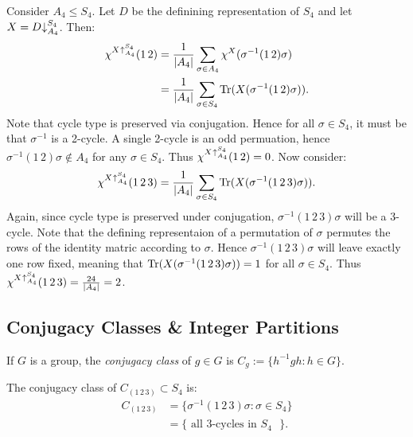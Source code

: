 \begin{example}
	Consider $A_4 \leq S_4$. Let $D$ be the definining representation of $S_4$ and let $X = D \hspace{-2.5pt}\downarrow_{A_4}^{S_4}$. Then:
	\begin{align*}
		\chi^{X \hspace{3pt}\uair_{A_4}^{S_4}}(1\,2)
		&= \frac{1}{|A_4|}\sum_{\sigma \in A_4}^{} \chi^X(\sigma^{-1}(1\,2)\sigma) \\
		&= \frac{1}{|A_4|}\sum_{\sigma \in S_4}^{} \Tr(X(\sigma^{-1}(1\,2)\sigma)).
	\end{align*}
	Note that cycle type is preserved via conjugation. Hence for all $\sigma \in S_4$, it must be that $\sigma^{-1}$ is a 2-cycle. A single 2-cycle is an odd permuation, hence $\sigma^{-1}(1\,2)\sigma \not\in A_4$ for any $\sigma \in S_4$. Thus $\chi^{X \hspace{3pt}\uair_{A_4}^{S_4}}(1\,2) = 0$. Now consider:
	\[
	\chi^{X \hspace{3pt}\uair_{A_4}^{S_4}}(1\,2\,3) = \frac{1}{|A_4|}\sum_{\sigma \in S_4}^{} \Tr(X(\sigma^{-1}(1\,2\,3)\sigma)).
	\] 
	Again, since cycle type is preserved under conjugation, $\sigma^{-1}(1\,2\,3)\sigma$ will be a 3-cycle. Note that the defining representaion of a permutation of $\sigma$ permutes the rows of the identity matric according to $\sigma$. Hence $\sigma^{-1}(1\,2\,3)\sigma$ will leave exactly one row fixed, meaning that $\operatorname{Tr}(X(\sigma^{-1}(1\,2\,3)\sigma)) = 1$ for all $\sigma \in S_4$. Thus $\chi^{X \hspace{3pt}\uair_{A_4}^{S_4}}(1\,2\,3) = \frac{24}{|A_4|} = 2$.
\end{example}

\subsection{Conjugacy Classes \& Integer Partitions}

\begin{definition}
	If $G$ is a group, the \emph{conjugacy class} of $g \in G$ is $C_g := \{h^{-1}gh : h \in G\}$.
\end{definition}

\begin{example}
	The conjugacy class of $C_{(1\,2\,3)} \subset S_4$ is:
	\begin{align*}
		C_{(1\,2\,3)}
		&= \{\sigma^{-1}(1\,2\,3)\sigma : \sigma \in S_4\} \\
		&= \{\text{ all 3-cycles in $S_4$ }\}.
	\end{align*}
\end{example}

